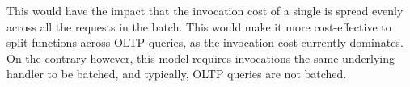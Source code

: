 This would have the impact that the invocation cost of a single is spread evenly across all the requests in the batch. This would make it more cost-effective to split functions across OLTP queries, as the invocation cost currently dominates. On the contrary however, this model requires invocations the same underlying handler to be batched, and typically, OLTP queries are not batched.
